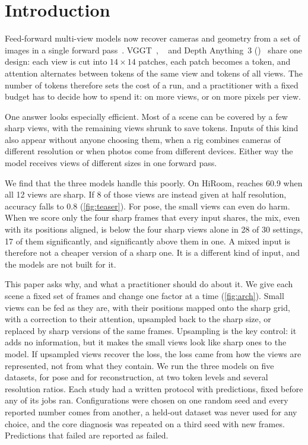 \section{Introduction}
\label{sec:intro}

Feed-forward multi-view models now recover cameras and geometry from a set of images in a single forward pass~\cite{wang2024dust3r,leroy2024mast3r,wang2025vggt,wang2025pi3,lin2025da3}. VGGT~\cite{wang2025vggt}, \pithree~\cite{wang2025pi3} and Depth Anything~3 (\dathree)~\cite{lin2025da3} share one design: each view is cut into $14{\times}14$ patches, each patch becomes a token, and attention alternates between tokens of the same view and tokens of all views. The number of tokens therefore sets the cost of a run, and a practitioner with a fixed budget has to decide how to spend it: on more views, or on more pixels per view.

One answer looks especially efficient. Most of a scene can be covered by a few sharp views, with the remaining views shrunk to save tokens. Inputs of this kind also appear without anyone choosing them, when a rig combines cameras of different resolution or when photos come from different devices. Either way the model receives views of different sizes in one forward pass.

We find that the three models handle this poorly. On HiRoom, \pithree reaches 60.9 \auc when all 12 views are sharp. If 8 of those views are instead given at half resolution, accuracy falls to 0.8 (\cref{fig:teaser}). For pose, the small views can even do harm. When we score only the four sharp frames that every input shares, the mix, even with its positions aligned, is below the four sharp views alone in 28 of 30 settings, 17 of them significantly, and significantly above them in one. A mixed input is therefore not a cheaper version of a sharp one. It is a different kind of input, and the models are not built for it.

This paper asks why, and what a practitioner should do about it. We give each scene a fixed set of frames and change one factor at a time (\cref{fig:arch}). Small views can be fed as they are, with their positions mapped onto the sharp grid, with a correction to their attention, upsampled back to the sharp size, or replaced by sharp versions of the same frames. Upsampling is the key control: it adds no information, but it makes the small views look like sharp ones to the model. If upsampled views recover the loss, the loss came from how the views are represented, not from what they contain. We run the three models on five datasets, for pose and for reconstruction, at two token levels and several resolution ratios. Each study had a written protocol with predictions, fixed before any of its jobs ran. Configurations were chosen on one random seed and every reported number comes from another, a held-out dataset was never used for any choice, and the core diagnosis was repeated on a third seed with new frames. Predictions that failed are reported as failed.


